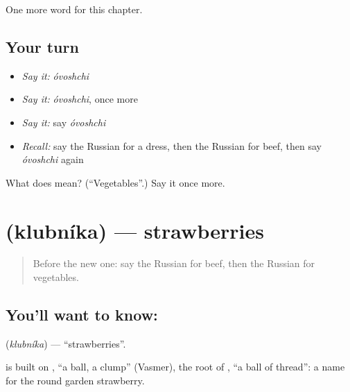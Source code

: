 \begin{grammarlens}[title={What you've built}]
One more word for this chapter.
\end{grammarlens}

\subsection*{Your turn}
\begin{itemize}
\raggedright
  \item \emph{Say it:} \emph{óvoshchi}
  \item \emph{Say it:} \emph{óvoshchi}, once more
  \item \emph{Say it:} say \emph{óvoshchi}
  \item \emph{Recall:} say the Russian for a dress, then the Russian for beef, then say \emph{óvoshchi} again
\end{itemize}

\begin{tcolorbox}[breakable,colback=teal!4,colframe=teal!35!black,title={Before you move on}]
What does  mean? (\textquotedblleft{}Vegetables\textquotedblright{}.) Say it once more.
\end{tcolorbox}
\section[\texorpdfstring{\ru{клубника} (klubníka)}{клубника (klubníka)}]{ (klubníka) — strawberries}

\label{lesson:RU-C104-strawberries}



\begin{quote}
Before the new one: say the Russian for beef, then the Russian for vegetables.
\end{quote}

\subsection*{You'll want to know: }
\textbf{} (\emph{klubníka}) — \textquotedblleft{}strawberries\textquotedblright{}.

\begin{cousinweb}
\textbf{} is built on \emph{}, \textquotedblleft{}a ball, a clump\textquotedblright{} (Vasmer), the root of \emph{}, \textquotedblleft{}a ball of thread\textquotedblright{}: a name for the round garden strawberry.
\end{cousinweb}

